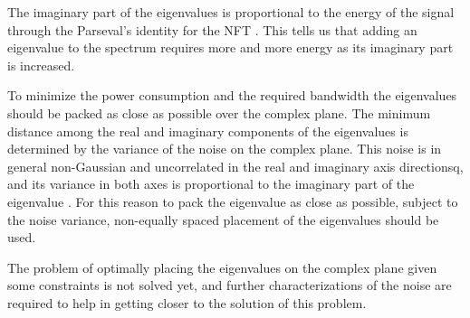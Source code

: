 
The imaginary part of the eigenvalues is proportional to the energy of the signal through the Parseval's identity for the \ac{NFT} \cite{Yousefi2014}. This tells us that adding an eigenvalue to the spectrum requires more and more energy as its imaginary part is increased.

To minimize the power consumption and the required bandwidth the eigenvalues should be packed as close as possible over the complex plane. The minimum distance among the real and imaginary components of the eigenvalues is determined by the variance of the noise on the complex plane. This noise is in general non-Gaussian and uncorrelated in the real and imaginary axis directionsq, and its variance in both axes is proportional to the imaginary part of the eigenvalue
\cite{zhang2015gaussian,zhang2015spectral,Zhang2,hari2016multieigenvalue,hari2016bi}.
For this reason to pack the eigenvalue as close as possible, subject to the noise variance, non-equally spaced placement of the eigenvalues \cite{vaibhav2016multipoint} should be used.

The problem of optimally placing the eigenvalues on the complex plane given some constraints is not solved yet, and further characterizations of the noise are required to help in getting closer to the solution of this problem.


